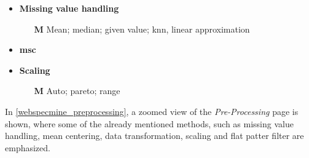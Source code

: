 \begin{multicols}{2}
\begin{itemize}
		\item \textbf{Missing value handling}
		\begin{itemize}
			\item[\textbf{M}] Mean; median; given value; \gls{knn}, linear approximation
		\end{itemize}
		\item \textbf{\acrlong{msc}}
		\item \textbf{Scaling}
		\begin{itemize}
			\item[\textbf{M}] Auto; pareto; range
		\end{itemize}				
	\end{itemize}
\end{multicols}



In \autoref{webspecmine_preprocessing}, a zoomed view of the \textit{Pre-Processing} page is shown, where some of the already mentioned methods, such as missing value handling, mean centering, data transformation, scaling and flat patter filter are emphasized.

